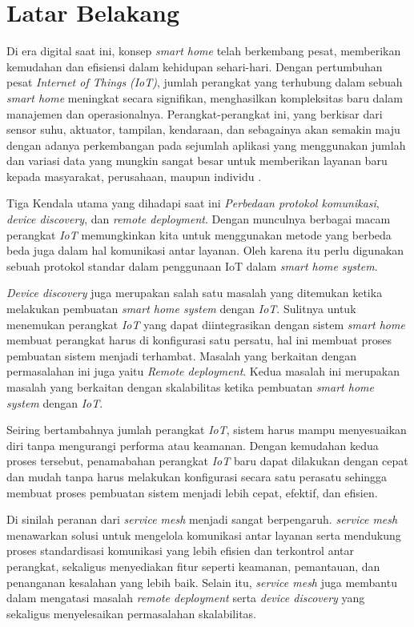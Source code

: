 \section{Latar Belakang}

Di era digital saat ini, konsep \textit{smart home} telah berkembang pesat, memberikan kemudahan dan efisiensi dalam kehidupan sehari-hari. Dengan pertumbuhan pesat \textit{Internet of Things} \textit{(IoT)}, jumlah perangkat yang terhubung dalam sebuah \textit{smart home} meningkat secara signifikan, menghasilkan kompleksitas baru dalam manajemen dan operasionalnya. Perangkat-perangkat ini, yang berkisar dari sensor suhu, aktuator, tampilan, kendaraan, dan sebagainya akan semakin maju dengan adanya perkembangan pada sejumlah aplikasi yang menggunakan jumlah dan variasi data yang mungkin sangat besar untuk memberikan layanan baru kepada masyarakat, perusahaan, maupun individu \parencite{IOTSmartCity}.

Tiga Kendala utama yang dihadapi saat ini \textit{Perbedaan protokol komunikasi}, \textit{device discovery}, dan \textit{remote deployment}. Dengan munculnya berbagai macam perangkat \textit{IoT} memungkinkan kita untuk menggunakan metode yang berbeda beda juga dalam hal komunikasi antar layanan. Oleh karena itu perlu digunakan sebuah protokol standar dalam penggunaan IoT dalam \textit{smart home system}.

\textit{Device discovery} juga merupakan salah satu masalah yang ditemukan ketika melakukan pembuatan \textit{smart home system} dengan \textit{IoT}. Sulitnya untuk menemukan perangkat \textit{IoT} yang dapat diintegrasikan dengan sistem \textit{smart home} membuat perangkat harus di konfigurasi satu persatu, hal ini membuat proses pembuatan sistem menjadi terhambat. Masalah yang berkaitan dengan permasalahan ini juga yaitu \textit{Remote deployment}. Kedua masalah ini merupakan masalah yang berkaitan dengan skalabilitas ketika pembuatan \textit{smart home system} dengan \textit{IoT}.

Seiring bertambahnya jumlah perangkat \textit{IoT}, sistem harus mampu menyesuaikan diri tanpa mengurangi performa atau keamanan. Dengan kemudahan kedua proses tersebut, penamabahan perangkat \textit{IoT} baru dapat dilakukan dengan cepat dan mudah tanpa harus melakukan konfigurasi secara satu perasatu sehingga membuat proses pembuatan sistem menjadi lebih cepat, efektif, dan efisien.

Di sinilah peranan dari \textit{service mesh} menjadi sangat berpengaruh. \textit{service mesh} menawarkan solusi untuk mengelola komunikasi antar layanan serta mendukung proses standardisasi komunikasi yang lebih efisien dan terkontrol antar perangkat, sekaligus menyediakan fitur seperti keamanan, pemantauan, dan penanganan kesalahan yang lebih baik. Selain itu, \textit{service mesh} juga membantu dalam mengatasi masalah \textit{remote deployment} serta \textit{device discovery} yang sekaligus menyelesaikan permasalahan skalabilitas.

